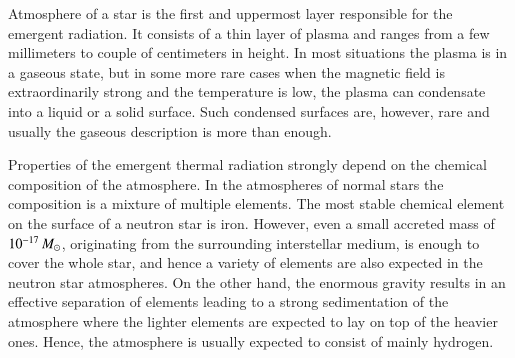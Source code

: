 Atmosphere of a star is the first and uppermost layer responsible for the emergent radiation.
It consists of a thin layer of plasma and ranges from a few millimeters to couple of centimeters in height.
In most situations the plasma is in a gaseous state, but in some more rare cases when the magnetic field is extraordinarily strong and the temperature is low, the plasma can condensate into a liquid or a solid surface.
Such condensed surfaces are, however, rare and usually the gaseous description is more than enough.\cite[for a review, see][]{ZP02, Potekhin14}


Properties of the emergent thermal radiation strongly depend on the chemical composition of the atmosphere.
In the atmospheres of normal stars the composition is a mixture of multiple elements.
The most stable chemical element on the surface of a neutron star is iron.
However, even a small accreted mass of $10^{-17}\, M_{\odot}$, originating from the surrounding interstellar medium, is enough to cover the whole star, and hence a variety of elements are also expected in the neutron star atmospheres.
On the other hand, the enormous gravity results in an effective separation of elements leading to a strong sedimentation of the atmosphere where the lighter elements are expected to lay on top of the heavier ones.\cite{AI80}
Hence, the atmosphere is usually expected to consist of mainly hydrogen.


